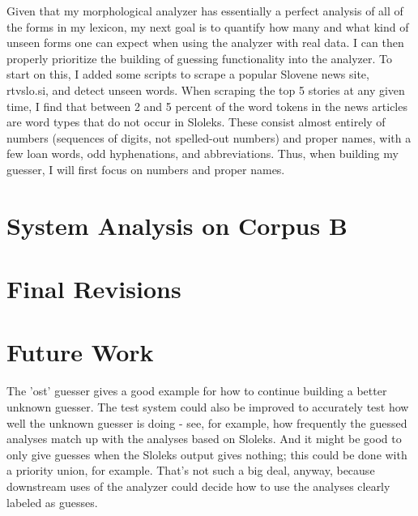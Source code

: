 \documentclass[11pt,letterpaper]{article}
\begin{document}
Given that my morphological analyzer has essentially a perfect analysis of all
of the forms in my lexicon, my next goal is to quantify how many and what kind
of unseen forms one can expect when using the analyzer with real data. I can
then properly prioritize the building of guessing functionality into the
analyzer.  To start on this, I added some scripts to scrape a popular Slovene
news site, rtvslo.si, and detect unseen words.  When scraping the top 5 stories
at any given time, I find that between 2 and 5 percent of the word tokens in
the news articles are word types that do not occur in Sloleks.  These consist
almost entirely of numbers (sequences of digits, not spelled-out numbers) and
proper names, with a few loan words, odd hyphenations, and abbreviations.
Thus, when building my guesser, I will first focus on numbers and proper names.

\section{System Analysis on Corpus B}

\section{Final Revisions}

\section{Future Work}

The 'ost' guesser gives a good example for how to continue building a better
unknown guesser.  The test system could also be improved to accurately test how
well the unknown guesser is doing - see, for example, how frequently the
guessed analyses match up with the analyses based on Sloleks.  And it might be
good to only give guesses when the Sloleks output gives nothing; this could be
done with a priority union, for example.  That's not such a big deal, anyway,
because downstream uses of the analyzer could decide how to use the analyses
clearly labeled as guesses.






\label{lastpage}
\end{document}

